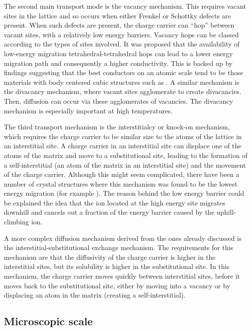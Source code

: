 \documentclass[10pt,a4paper, titlepage]{article}
\begin{document}
The second main transport mode is the vacancy mechanism. This requires vacant sites in the lattice and so occurs when either Frenkel or Schottky defects are present.
When such defects are present, the charge carrier can “hop” between vacant sites, with a relatively low energy barriers. 
Vacancy hops can be classed according to the types of sites involved.
It was proposed that the availability of low-energy migration tetrahedral-tetrahedral hops can lead to a lower energy migration path and consequently a higher conductivity. \cite{RN5}
This is backed up by findings suggesting that the best conductors on an atomic scale tend to be those materials with body centered cubic structures such as . 
A similar mechanism is the divacancy mechanism, where vacant sites agglomerate to create divacancies. 
Then, diffusion can occur via these agglomerates of vacancies. 
The divacancy mechanism is especially important at high temperatures. 

The third transport mechanism is the interstitialcy or knock-on mechanism, which requires the charge carrier to be similar size to the atoms of the lattice in an interstitial site. 
A charge carrier in an interstitial site can displace one of the atoms of the matrix and move to a substitutional site, leading to the formation of a self-interstitial (an atom of the matrix in an interstitial site) and the movement of the charge carrier. 
Although this might seem complicated, there have been a number of crystal structures where this mechanism was found to be the lowest energy migration (for example ). \cite{RN2} 
The reason behind the low energy barrier could be explained the idea that the ion located at the high energy site migrates downhill and cancels out a fraction of the energy barrier caused by the uphill-climbing ion. \cite{RN3}

A more complex diffusion mechanism derived from the ones already discussed is the interstitial-substitutional exchange mechanism. 
The requirements for this mechanism are that the diffusivity of the charge carrier is higher in the interstitial sites, but its solubility is higher in the substitutional site. 
In this mechanism, the charge carrier moves quickly between interstitial sites, before it moves back to the substitutional site, either by moving into a vacancy or by displacing an atom in the matrix (creating a self-interstitial). \cite{RN4} 

\subsection{Microscopic scale}
\end{document}
